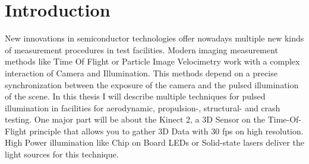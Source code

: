 \section[Introduction]{Introduction}\label{sec:motivation}
New innovations in semiconductor technologies offer nowadays multiple new kinds of measurement procedures in test facilities. Modern imaging measurement methods like Time Of Flight or Particle Image Velocimetry work with a complex interaction of Camera and Illumination. This methods depend on a precise synchronization between the exposure of the camera and the pulsed illumination of the scene. In this thesis I will describe multiple techniques for pulsed illumination in facilities for aerodynamic, propulsion-, structural- and crash testing. One major part will be about the Kinect 2, a 3D Sensor on the Time-Of-Flight principle that allows you to gather 3D Data with 30 fps on high resolution. High Power illumination like Chip on Board LEDs or Solid-state lasers deliver the light sources for this technique.     
